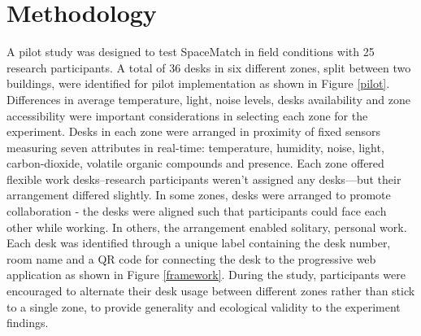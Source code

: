 \documentclass[]{interact}
\theoremstyle{plain}%
\theoremstyle{definition}
\theoremstyle{remark}
\begin{document}
\section{Methodology}
\label{section:methods}
A pilot study was designed to test SpaceMatch in field conditions with 25 research participants. A total of 36 desks in six different zones, split between two buildings, were identified for pilot implementation as shown in Figure \ref{pilot}. Differences in average temperature, light, noise levels, desks availability and zone accessibility were important considerations in selecting each zone for the experiment. Desks in each zone were arranged in proximity of fixed sensors measuring seven attributes in real-time: temperature, humidity, noise, light, carbon-dioxide, volatile organic compounds and presence. Each zone offered flexible work desks--research participants weren't assigned any desks---but their arrangement differed slightly. In some zones, desks were arranged to promote collaboration - the desks were aligned such that participants could face each other while working. In others, the arrangement enabled solitary, personal work. Each desk was identified through a unique label containing the desk number, room name and a QR code for connecting the desk to the progressive web application as shown in Figure \ref{framework}. During the study, participants were encouraged to alternate their desk usage between different zones rather than stick to a single zone, to provide generality and ecological validity to the experiment findings. 
\end{document}
